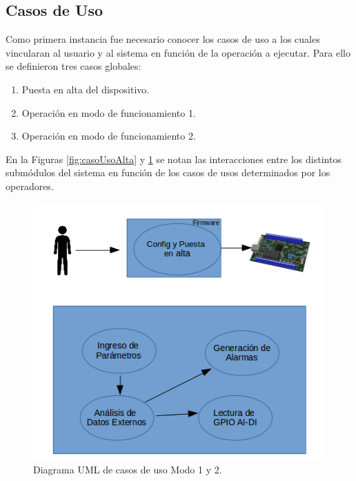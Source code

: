 \subsection{Casos de Uso}

Como primera instancia fue necesario conocer los casos de uso a los cuales vincularan al usuario y al sistema en función de la operación a ejecutar. Para ello se definieron tres casos globales:
\begin{enumerate}
	\item Puesta en alta del dispositivo.
	\item Operación en modo de funcionamiento 1.
	\item Operación en modo de funcionamiento 2.
\end{enumerate}

En la Figuras \ref{fig:casoUsoAlta} y \ref{fig:casodeUso1y2} se notan las interacciones entre los distintos submódulos del sistema en función de los casos de usos determinados por los operadores.

\begin{figure}[h!]
	\centering
	\includegraphics[width=.8\textwidth]{Figures/caso_uso_1y2_UML}
	\caption{Diagrama UML de casos de uso Modo 1 y 2.}
	\label{fig:casodeUso1y2}
\end{figure}

